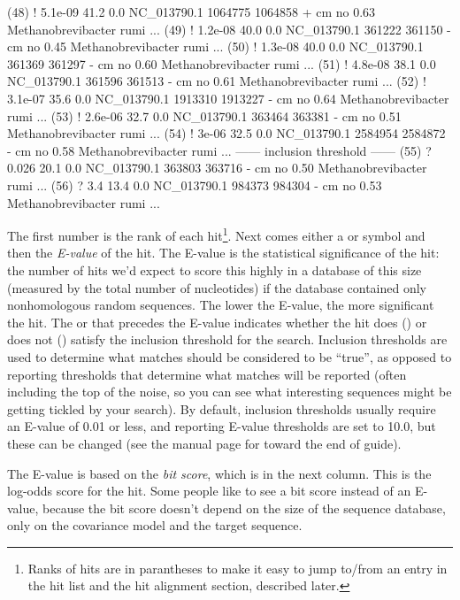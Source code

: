 \begin{sreoutput}
 (48) !   5.1e-09   41.2   0.0  NC_013790.1 1064775 1064858 +  cm    no 0.63  Methanobrevibacter rumi ...
 (49) !   1.2e-08   40.0   0.0  NC_013790.1  361222  361150 -  cm    no 0.45  Methanobrevibacter rumi ...
 (50) !   1.3e-08   40.0   0.0  NC_013790.1  361369  361297 -  cm    no 0.60  Methanobrevibacter rumi ...
 (51) !   4.8e-08   38.1   0.0  NC_013790.1  361596  361513 -  cm    no 0.61  Methanobrevibacter rumi ...
 (52) !   3.1e-07   35.6   0.0  NC_013790.1 1913310 1913227 -  cm    no 0.64  Methanobrevibacter rumi ...
 (53) !   2.6e-06   32.7   0.0  NC_013790.1  363464  363381 -  cm    no 0.51  Methanobrevibacter rumi ...
 (54) !     3e-06   32.5   0.0  NC_013790.1 2584954 2584872 -  cm    no 0.58  Methanobrevibacter rumi ...
 ------ inclusion threshold ------
 (55) ?     0.026   20.1   0.0  NC_013790.1  363803  363716 -  cm    no 0.50  Methanobrevibacter rumi ...
 (56) ?       3.4   13.4   0.0  NC_013790.1  984373  984304 -  cm    no 0.53  Methanobrevibacter rumi ...
\end{sreoutput}

The first number is the rank of each hit\footnote{Ranks of hits are in
  parantheses to make it easy to jump to/from an entry in the hit list
  and the hit alignment section, described later.}. Next comes either a
\otext{!} or  symbol and then the \emph{E-value} of the hit.
The E-value is the statistical significance of the hit: the number of
hits we'd expect to score this highly in a database of this size
(measured by the total number of nucleotides) if the database
contained only nonhomologous random sequences. The lower the E-value,
the more significant the hit. The \otext{!} or  that
precedes the E-value indicates whether the hit does (\otext{!}) or
does not () satisfy the inclusion threshold for the search.
Inclusion thresholds are used to determine what matches should be
considered to be ``true'', as opposed to reporting thresholds that
determine what matches will be reported (often including the top of
the noise, so you can see what interesting sequences might be getting
tickled by your search). By default, inclusion thresholds usually
require an E-value of 0.01 or less, and reporting E-value thresholds
are set to 10.0, but these can be changed (see the manual page for
 toward the end of guide).

The E-value is based on the \emph{bit score}, which is in the next
column. This is the log-odds score for the hit. Some people like to
see a bit score instead of an E-value, because the bit score doesn't
depend on the size of the sequence database, only on the covariance
model and the target sequence.

